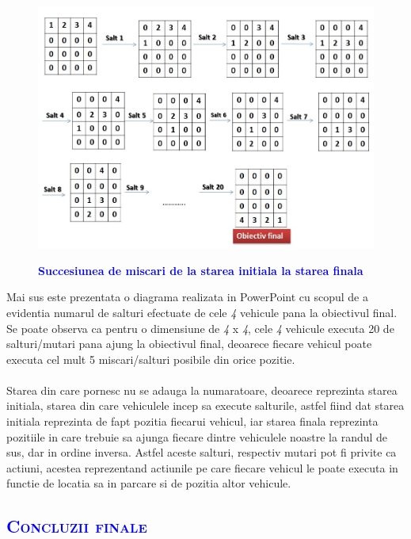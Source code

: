\documentclass{article}
\begin{document}
\begin{figure}
    \centering
    \includegraphics[width=15cm]{salturi-posibile.jpg}
    \bfseries\caption{\textbf{\textcolor{blue}{Succesiunea de miscari de la starea initiala la starea finala}}}
    \vspace{1cm}
\end{figure}
Mai sus este prezentata o diagrama realizata in PowerPoint cu scopul de a evidentia  numarul de salturi efectuate de cele \emph 4 vehicule pana la obiectivul final.
Se poate observa ca pentru o dimensiune de \emph 4 x \emph 4, cele \emph 4 vehicule executa 20 de salturi/mutari pana ajung la obiectivul final, deoarece fiecare vehicul poate executa cel mult 5 miscari/salturi posibile din orice pozitie.\\\\ Starea din care pornesc nu se adauga la numaratoare, deoarece reprezinta starea initiala, starea din care vehiculele incep sa execute salturile, astfel fiind dat starea initiala reprezinta de fapt pozitia fiecarui vehicul, iar starea finala reprezinta pozitiile in care trebuie sa ajunga fiecare dintre vehiculele noastre la randul de sus, dar in ordine inversa. Astfel aceste salturi, respectiv mutari pot fi privite ca actiuni, acestea reprezentand actiunile pe care fiecare vehicul le poate executa in functie de locatia sa in parcare si de pozitia altor vehicule.\par
\newpage
\begin{flushleft}
\begin{center}
    \textcolor{blue}{\section{\bfseries\scshape\textcolor{blue}{Concluzii finale}}}
    \vspace{5mm}
\end{center}
\end{flushleft}
\end{document}
